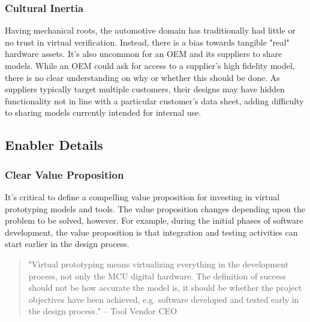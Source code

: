 \subsubsection*{Cultural Inertia}
Having mechanical roots, the automotive domain has traditionally had little or no trust in virtual verification. Instead, there is a bias towards tangible "real" hardware assets.
It's also uncommon for an OEM and its suppliers to share models.
While an OEM could ask for access to a supplier’s high fidelity model, there is no clear understanding on why or whether this should be done.
As suppliers typically target multiple customers, their designs may have hidden functionality not in line with a particular customer’s data sheet,
adding difficulty to sharing models currently intended for internal use.



\subsection{Enabler Details}
\subsubsection*{Clear Value Proposition}
It's critical to define a compelling value proposition for investing in virtual prototyping models and tools.
The value proposition changes depending upon the problem to be solved, however.
For example, during the initial phases of software development,
the value proposition is that
integration and testing activities can start earlier in the design process.

\begin{quote}
"Virtual prototyping means virtualizing everything in the development process, not only the MCU digital hardware.
The definition of success should not be how accurate the model is,
it should be whether the project objectives have been achieved, e.g. software developed and tested early in the design process."
-- Tool Vendor CEO
\end{quote}

